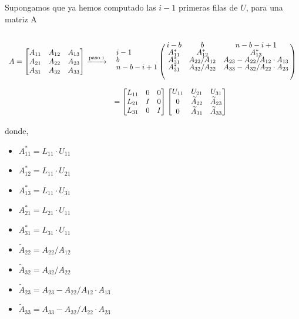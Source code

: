 \documentclass[a4paper,12pt]{article}
\begin{document}
Supongamos que ya hemos computado las $i-1$ primeras filas de $U$, para una matriz A

\begin{equation}
\begin{array}{l l}
  		A = 
  		\begin{bmatrix}
			A_{11} & A_{12} & A_{13} \\
			A_{21} & A_{22} & A_{23} \\
			A_{31} & A_{32} & A_{33}  		
  		\end{bmatrix}
  		\xrightarrow{\text{paso i}} &
  		\bordermatrix{
  				 	& i-b & b & n-b-i+1 \cr
                	i-1     & A_{11}^{*} & A_{12}^{*} & A_{13}^{*}\\
                	b       & A_{31}^{*} & A_{22}/A_{12} & A_{23} - A_{22}/A_{12}\cdot A_{13} \\
                	n-b-i+1 & A_{31}^{*} & A_{32}/A_{22} & A_{33} - A_{32}/A_{22}\cdot A_{23}
                }\\[1cm]
	  \, & = 
	  \begin{bmatrix}
			L_{11} & 0 & 0 \\
			L_{21} & I & 0 \\
			L_{31} & 0 & I	  	
	  \end{bmatrix}
	  \begin{bmatrix}
			U_{11} & U_{21} & U_{31} \\
			0 & \widetilde{A}_{22} & \widetilde{A}_{23} \\
			0 & \widetilde{A}_{31} & \widetilde{A}_{33}
	  \end{bmatrix}\\
\end{array}
\end{equation}

donde,

\begin{multicols}{2}
	\begin{itemize}
		\item $A_{11}^{*} = L_{11}\cdot U_{11}$
		\item $A_{12}^{*} = L_{11}\cdot U_{21}$
		\item $A_{13}^{*} = L_{11}\cdot U_{31}$
		\item $A_{21}^{*} = L_{21}\cdot U_{11}$
		\item $A_{31}^{*} = L_{31}\cdot U_{11}$
	\end{itemize}
	\begin{itemize}
		\item $\widetilde{A}_{22} = A_{22}/A_{12}$
		\item $\widetilde{A}_{32} = A_{32}/A_{22}$
		\item $\widetilde{A}_{23} = A_{23} - A_{22}/A_{12}\cdot A_{13}$
		\item $\widetilde{A}_{33} = A_{33} - A_{32}/A_{22}\cdot A_{23}$
	\end{itemize}
\end{multicols}
\end{document}

